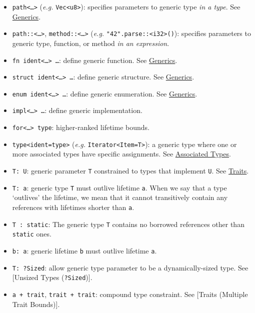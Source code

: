 \documentclass[a4paper,]{book}
\providecommand{\tightlist}{%
  \setlength{\itemsep}{0pt}\setlength{\parskip}{0pt}}
\begin{document}
\begin{itemize}
\tightlist
\item
  \texttt{path\textless{}\ldots{}\textgreater{}} (\emph{e.g.}
  \texttt{Vec\textless{}u8\textgreater{}}): specifies parameters to
  generic type \emph{in a type}. See
  \protect\hyperlink{sec--generics}{Generics}.
\item
  \texttt{path::\textless{}\ldots{}\textgreater{}},
  \texttt{method::\textless{}\ldots{}\textgreater{}} (\emph{e.g.}
  \texttt{"42".parse::\textless{}i32\textgreater{}()}): specifies
  parameters to generic type, function, or method \emph{in an
  expression}.
\item
  \texttt{fn\ ident\textless{}\ldots{}\textgreater{}\ \ldots{}}: define
  generic function. See \protect\hyperlink{sec--generics}{Generics}.
\item
  \texttt{struct\ ident\textless{}\ldots{}\textgreater{}\ \ldots{}}:
  define generic structure. See
  \protect\hyperlink{sec--generics}{Generics}.
\item
  \texttt{enum\ ident\textless{}\ldots{}\textgreater{}\ \ldots{}}:
  define generic enumeration. See
  \protect\hyperlink{sec--generics}{Generics}.
\item
  \texttt{impl\textless{}\ldots{}\textgreater{}\ \ldots{}}: define
  generic implementation.
\item
  \texttt{for\textless{}\ldots{}\textgreater{}\ type}: higher-ranked
  lifetime bounds.
\item
  \texttt{type\textless{}ident=type\textgreater{}} (\emph{e.g.}
  \texttt{Iterator\textless{}Item=T\textgreater{}}): a generic type
  where one or more associated types have specific assignments. See
  \protect\hyperlink{sec--associated-types}{Associated Types}.
\end{itemize}

\begin{itemize}
\tightlist
\item
  \texttt{T:\ U}: generic parameter \texttt{T} constrained to types that
  implement \texttt{U}. See \protect\hyperlink{sec--traits}{Traits}.
\item
  \texttt{T:\ \textquotesingle{}a}: generic type \texttt{T} must outlive
  lifetime \texttt{\textquotesingle{}a}. When we say that a type
  `outlives' the lifetime, we mean that it cannot transitively contain
  any references with lifetimes shorter than
  \texttt{\textquotesingle{}a}.
\item
  \texttt{T\ :\ \textquotesingle{}static}: The generic type \texttt{T}
  contains no borrowed references other than
  \texttt{\textquotesingle{}static} ones.
\item
  \texttt{\textquotesingle{}b:\ \textquotesingle{}a}: generic lifetime
  \texttt{\textquotesingle{}b} must outlive lifetime
  \texttt{\textquotesingle{}a}.
\item
  \texttt{T:\ ?Sized}: allow generic type parameter to be a
  dynamically-sized type. See {[}Unsized Types (\texttt{?Sized}){]}.
\item
  \texttt{\textquotesingle{}a\ +\ trait}, \texttt{trait\ +\ trait}:
  compound type constraint. See {[}Traits (Multiple Trait Bounds){]}.
\end{itemize}
\end{document}
